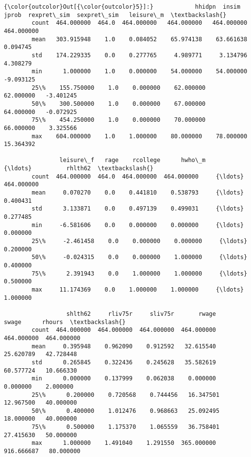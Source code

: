 \documentclass[11pt]{article}
\begin{document}
\begin{Verbatim}[commandchars=\\\{\}]
{\color{outcolor}Out[{\color{outcolor}5}]:}            hhidpn  insim       jprob  rexpret\_sim  sexpret\_sim   leisure\_m  \textbackslash{}
        count  464.000000  464.0  464.000000   464.000000   464.000000  464.000000   
        mean   303.915948    1.0    0.084052    65.974138    63.661638    0.094745   
        std    174.229335    0.0    0.277765     4.989771     3.134796    4.308279   
        min      1.000000    1.0    0.000000    54.000000    54.000000   -9.093125   
        25\%    155.750000    1.0    0.000000    62.000000    62.000000   -3.401245   
        50\%    300.500000    1.0    0.000000    67.000000    64.000000   -0.072925   
        75\%    454.250000    1.0    0.000000    70.000000    66.000000    3.325566   
        max    604.000000    1.0    1.000000    80.000000    78.000000   15.364392   
        
                leisure\_f   rage    rcollege      hwho\_m     {\ldots}          rhlth62  \textbackslash{}
        count  464.000000  464.0  464.000000  464.000000     {\ldots}       464.000000   
        mean     0.070270    0.0    0.441810    0.538793     {\ldots}         0.400431   
        std      3.133871    0.0    0.497139    0.499031     {\ldots}         0.277485   
        min     -6.581606    0.0    0.000000    0.000000     {\ldots}         0.000000   
        25\%     -2.461458    0.0    0.000000    0.000000     {\ldots}         0.200000   
        50\%     -0.024315    0.0    0.000000    1.000000     {\ldots}         0.400000   
        75\%      2.391943    0.0    1.000000    1.000000     {\ldots}         0.500000   
        max     11.174369    0.0    1.000000    1.000000     {\ldots}         1.000000   
        
                  shlth62     rliv75r     sliv75r       rwage       swage      rhours  \textbackslash{}
        count  464.000000  464.000000  464.000000  464.000000  464.000000  464.000000   
        mean     0.395948    0.962090    0.912592   32.615540   25.620789   42.728448   
        std      0.265845    0.322436    0.245628   35.582619   60.577724   10.666330   
        min      0.000000    0.137999    0.062038    0.000000    0.000000    2.000000   
        25\%      0.200000    0.720568    0.744456   16.347501   12.967500   40.000000   
        50\%      0.400000    1.012476    0.968663   25.092495   18.000000   40.000000   
        75\%      0.500000    1.175370    1.065559   36.758401   27.415630   50.000000   
        max      1.000000    1.491040    1.291550  365.000000  916.666687   80.000000   
        

\end{Verbatim}
\end{document}
